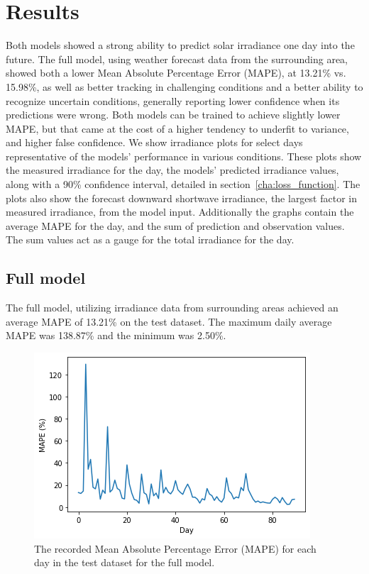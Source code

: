 \chapter{Results}
Both models showed a strong ability to predict solar irradiance one day into the future.
The full model, using weather forecast data from the surrounding area, showed both a lower Mean Absolute Percentage Error (MAPE), at 13.21\% vs. 15.98\%, as well as better tracking in challenging conditions and a better ability to recognize uncertain conditions, generally reporting lower confidence when its predictions were wrong. Both models can be trained to achieve slightly lower MAPE, but that came at the cost of a higher tendency to underfit to variance, and higher false confidence.
We show irradiance plots for select days representative of the models' performance in various conditions. These plots show the measured irradiance for the day, the models' predicted irradiance values, along with a 90\% confidence interval, detailed in section~\ref{cha:loss_function}. The plots also show the forecast downward shortwave irradiance, the largest factor in measured irradiance, from the model input. Additionally the graphs contain the average MAPE for the day, and the sum of prediction and observation values. The sum values act as a gauge for the total irradiance for the day.


\section{Full model}
The full model, utilizing irradiance data from surrounding areas achieved an average MAPE of 13.21\% on the test dataset. The maximum daily average MAPE was 138.87\% and the minimum was 2.50\%. 
\begin{figure}[ht!]
    \centering
    \includegraphics[scale=0.75]{imgs/graphs/full/days_full.png}
    \caption{The recorded Mean Absolute Percentage Error (MAPE) for each day in the test dataset for the full model. 
    \label{fig:days_full}}
\end{figure}




